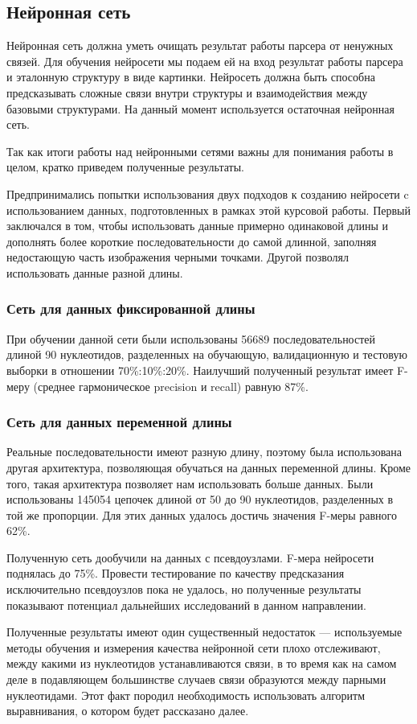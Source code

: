 \documentclass[14pt]{matmex-diploma-custom}
\begin{document}
\subsection{Нейронная сеть}
Нейронная сеть должна уметь очищать результат работы парсера от ненужных связей. Для обучения нейросети мы подаем ей на вход результат работы парсера и эталонную структуру в виде картинки. Нейросеть должна быть способна предсказывать сложные связи внутри структуры и взаимодействия между базовыми структурами. На данный момент используется остаточная нейронная сеть. \par
Так как итоги работы над нейронными сетями важны для понимания работы в целом, кратко приведем полученные результаты. \par
Предпринимались попытки использования двух подходов к созданию нейросети c использованием данных, подготовленных в рамках этой курсовой работы. Первый заключался в том, чтобы использовать данные примерно одинаковой длины и дополнять более короткие последовательности до самой длинной, заполняя недостающую часть изображения черными точками. Другой позволял использовать данные разной длины.
\subsubsection{Сеть для данных фиксированной длины}
При обучении данной сети были использованы 56689 последовательностей длиной 90 нуклеотидов, разделенных на обучающую, валидационную и тестовую выборки в отношении 70\%:10\%:20\%. Наилучший полученный результат имеет F-меру (среднее гармоническое precision и recall) равную 87\%.
\subsubsection{Сеть для данных переменной длины}
Реальные последовательности имеют разную длину, поэтому была использована другая архитектура, позволяющая обучаться на данных переменной длины. Кроме того, такая архитектура позволяет нам использовать больше данных. Были использованы 145054 цепочек длиной от 50 до 90 нуклеотидов, разделенных в той же пропорции.
Для этих данных удалось достичь значения F-меры равного 62\%. \par 
Полученную сеть дообучили на данных с псевдоузлами. F-мера нейросети поднялась до 75\%. Провести тестирование по качеству предсказания исключительно псевдоузлов пока не удалось, но полученные результаты показывают потенциал дальнейших исследований в данном направлении.
\par Полученные результаты имеют один существенный недостаток --- используемые методы обучения и измерения качества нейронной сети плохо отслеживают, между какими из нуклеотидов устанавливаются связи, в то время как на самом деле в подавляющем большинстве случаев связи образуются между парными нуклеотидами. Этот факт породил необходимость использовать алгоритм выравнивания, о котором будет рассказано далее.
\end{document}
